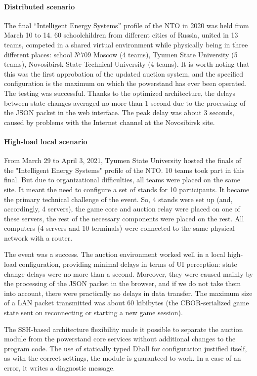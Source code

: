 \documentclass[
]{ceurart}
\begin{document}
\paragraph{Distributed scenario}
\label{sec:eval-distr}
The final “Intelligent Energy Systems” profile of the NTO in 2020 was held from March 10 to 14. 60 schoolchildren from different cities of Russia, united in 13 teams, competed in a shared virtual environment while physically being in three different places:
school №709 Moscow (4 teams),
Tyumen State University (5 teams),
Novosibirsk State Technical University (4 teams).
It is worth noting that this was the first approbation of the updated auction system, and the specified configuration is the maximum on which the powerstand has ever been operated. The testing was successful. Thanks to the optimized architecture, the delays between state changes averaged no more than 1 second due to the processing of the JSON packet in the web interface. The peak delay was about 3 seconds, caused by problems with the Internet channel at the Novosibirsk site.

\paragraph{High-load local scenario}
\label{sec:eval-high}
From March 29 to April 3, 2021, Tyumen State University hosted the finals of the "Intelligent Energy Systems" profile of the NTO. 10 teams took part in this final. But due to organizational difficulties, all teams were placed on the same site. It meant the need to configure a set of stands for 10 participants. It became the primary technical challenge of the event. So, 4 stands were set up (and, accordingly, 4 servers), the game core and auction relay were placed on one of these servers, the rest of the necessary components were placed on the rest. All computers (4 servers and 10 terminals) were connected to the same physical network with a router.

The event was a success. The auction environment worked well in a local high-load configuration, providing minimal delays in terms of UI perception: state change delays were no more than a second. Moreover, they were caused mainly by the processing of the JSON packet in the browser, and if we do not take them into account, there were practically no delays in data transfer. The maximum size of a LAN packet transmitted was about 60 kibibytes (the CBOR-serialized game state sent on reconnecting or starting a new game session).

The SSH-based architecture flexibility made it possible to separate the auction module from the powerstand core services without additional changes to the program code. The use of statically typed Dhall for configuration ​​justified itself, as with the correct settings, the module is guaranteed to work. In a case of an error, it writes a diagnostic message.
\end{document}
